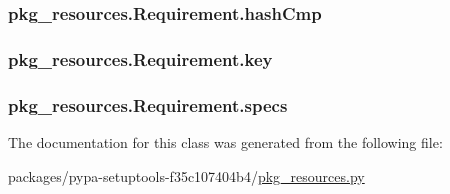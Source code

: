 \subsubsection[{hash\+Cmp}]{\setlength{\rightskip}{0pt plus 5cm}pkg\+\_\+resources.\+Requirement.\+hash\+Cmp}\label{classpkg__resources_1_1Requirement_a13d1c727c4b2101a1db794d9784d9ca4}
\hypertarget{classpkg__resources_1_1Requirement_a87c67bd2d8f19575cc4f0a5928b1cea9}{}
\subsubsection[{key}]{\setlength{\rightskip}{0pt plus 5cm}pkg\+\_\+resources.\+Requirement.\+key}\label{classpkg__resources_1_1Requirement_a87c67bd2d8f19575cc4f0a5928b1cea9}
\hypertarget{classpkg__resources_1_1Requirement_a1fce8b84c1951724bcd1b792a65a1be4}{}
\subsubsection[{specs}]{\setlength{\rightskip}{0pt plus 5cm}pkg\+\_\+resources.\+Requirement.\+specs}\label{classpkg__resources_1_1Requirement_a1fce8b84c1951724bcd1b792a65a1be4}


The documentation for this class was generated from the following file\+:\begin{DoxyCompactItemize}
\item 
packages/pypa-\/setuptools-\/f35c107404b4/\hyperlink{pkg__resources_8py}{pkg\+\_\+resources.\+py}\end{DoxyCompactItemize}
